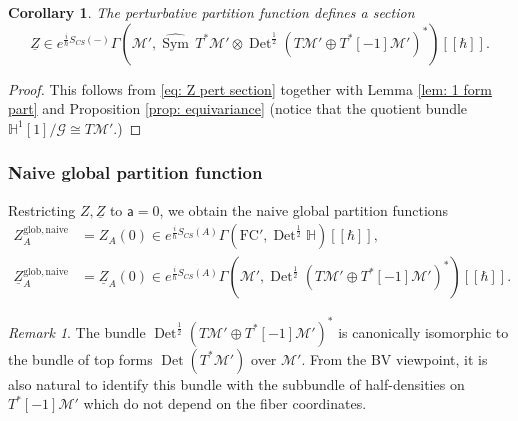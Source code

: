 \documentclass[11pt,a4paper]{amsart}
\theoremstyle{plain} %
\newtheorem{cor}[thm]{Corollary}
\theoremstyle{definition}
\theoremstyle{remark}
\newtheorem{rem}[thm]{Remark}
\newcommand{\Det}{\operatorname{Det}}
\newcommand{\Sym}{\operatorname{Sym}}
\newcommand{\mr}{\mathrm}
\newcommand{\sfa}{\mathsf{a}}
\newcommand{\M}{\mathcal{M}}
\newcommand{\wh}{\widehat}
\newcommand{\FC}{\mathrm{FC}}
\newcommand{\sfg}{\mathrm{g}} %
\begin{document}
{%
\begin{cor}
    The perturbative partition function defines a section 
    \begin{equation}
        \underline{Z} \in  e^{\frac{i}{\hbar}S_{CS}(-)} \Gamma(\M', \wh{\Sym}\,T^*\M' \otimes \Det^\frac12(T\M'\oplus T^*[-1]\M')^*)[[\hbar]].
    \end{equation}
\end{cor}
\begin{proof}
    This follows from \eqref{eq: Z pert section} together with Lemma \ref{lem: 1 form part} and Proposition \ref{prop: equivariance} (notice that the quotient bundle $\mathbb{H}^1[1]/\mathcal{G} \cong T\M'$.) 
\end{proof}
\subsubsection{Naive global partition function} 
Restricting $Z, \underline{Z}$ to $\sfa=0$, we obtain the naive global partition functions 
\begin{equation}
    \begin{aligned}
        Z^\mr{glob,naive}_A &= Z_A(0) \in e^{\frac{i}{\hbar}S_{CS}(A)}\Gamma(\FC', \Det^\frac12\mathbb{H} )[[\hbar]], \\
        \underline{Z}^\mr{glob,naive}_{A} &= \underline{Z}_{A}(0) \in e^{\frac{i}{\hbar}S_{CS}(A)}\Gamma(\M', \Det^\frac12(T\M'\oplus T^*[-1]\M')^*)[[\hbar]] .
    \end{aligned}
\end{equation}
\begin{rem}
    The bundle $\Det^\frac{1}{2}(T\M'\oplus T^*[-1]\M')^*$ is canonically isomorphic to the bundle of top forms $\Det(T^*\M')$ over $\M'$. From the BV viewpoint, it is also natural to identify this bundle with the subbundle of half-densities on $T^*[-1]\M'$ which do not depend on the fiber coordinates. %
\end{rem}

}
\end{document}
